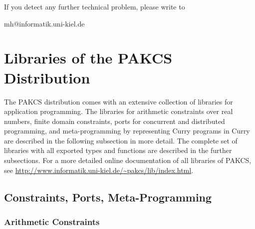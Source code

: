 \documentclass[11pt,fleqn]{article}
\renewcommand{\tt}{\usefont{OT1}{cmtt}{m}{n}\selectfont}
\newcommand{\codefont}{\small\tt}
\newcommand{\code}[1]{\mbox{\codefont #1}}
\newcommand{\CYS}{PAKCS\xspace} %
\begin{document}
If you detect any further technical problem,
please write to
\begin{center}
\code{mh@informatik.uni-kiel.de}
\end{center}

\newpage




\newpage
\appendix

\section{Libraries of the \CYS Distribution}
\label{sec:libraries}

{\setlength{\parindent}{0.0cm}

The \CYS distribution comes with an extensive collection
of libraries for application programming.
The libraries for arithmetic constraints over real numbers,
finite domain constraints,
ports for concurrent and distributed programming, and
meta-programming by representing Curry programs in Curry
are described in the following subsection in more detail.
The complete set of libraries with all exported types and functions
are described in the further subsections.
For a more detailed online documentation of all libraries of \CYS,
see \url{http://www.informatik.uni-kiel.de/~pakcs/lib/index.html}.

\subsection{Constraints, Ports, Meta-Programming}

\subsubsection{Arithmetic Constraints}

}
\end{document}
